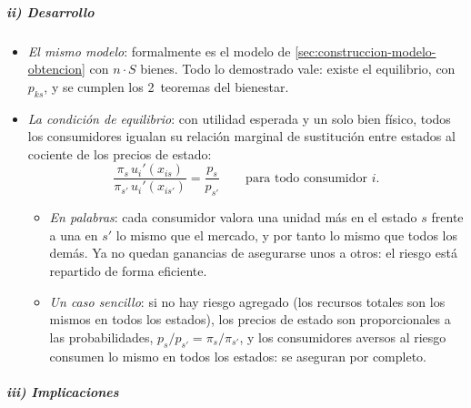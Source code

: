 \documentclass[11pt]{article}
\begin{document}
\subparagraph{ii) Desarrollo}

\begin{itemize}
\item \emph{El mismo modelo}: formalmente es el modelo de \ref{sec:construccion-modelo-obtencion} con $n\cdot S$ bienes. Todo lo demostrado vale: existe el equilibrio, con  $p_{ks}$, y se cumplen los 2~teoremas del bienestar.
\item \emph{La condición de equilibrio}: con utilidad esperada y un solo bien físico, todos los consumidores igualan su relación marginal de sustitución entre estados al cociente de los precios de estado:
  \begin{equation}
  \frac{\pi_s\,u_i'(x_{is})}{\pi_{s'}\,u_i'(x_{is'})}=\frac{p_s}{p_{s'}}\qquad\text{para todo consumidor } i. \label{eq:precios-estado}
  \end{equation}
  \begin{itemize}
  \item \emph{En palabras}: cada consumidor valora una unidad más en el estado $s$ frente a una en $s'$ lo mismo que el mercado, y por tanto lo mismo que todos los demás. Ya no quedan ganancias de asegurarse unos a otros: el riesgo está repartido de forma eficiente.
  \item \emph{Un caso sencillo}: si no hay riesgo agregado (los recursos totales son los mismos en todos los estados), los precios de estado son proporcionales a las probabilidades, $p_s/p_{s'}=\pi_s/\pi_{s'}$, y los consumidores aversos al riesgo consumen lo mismo en todos los estados: se aseguran por completo.
  \end{itemize}
\end{itemize}

\subparagraph{iii) Implicaciones}
\end{document}
